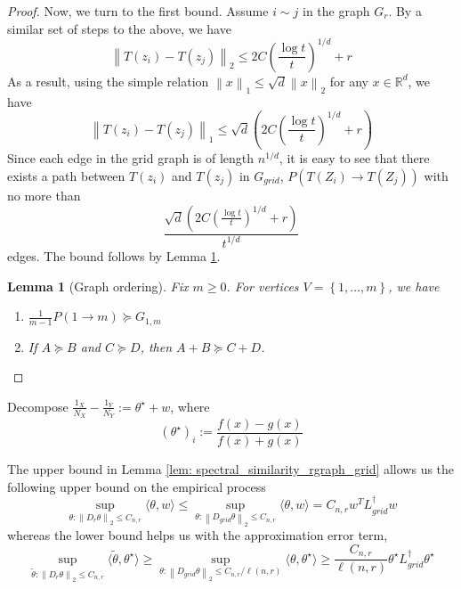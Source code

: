 \documentclass{article}
\newcommand{\Reals}{\mathbb{R}}
\newcommand{\norm}[1]{\left\lVert#1\right\rVert}
\newcommand{\set}[1]{\left\{#1\right\}}
\newcommand{\dotp}[2]{\langle #1, #2 \rangle}
\newcommand{\1}{\mathbb{I}}
\newcommand{\Linv}{L^{\dagger}}
\newcommand{\Rd}{\Reals^d}
\theoremstyle{alden}
\theoremstyle{aldenthm}
\newtheorem{lemma}{Lemma}
\theoremstyle{definition}
\theoremstyle{remark}
\begin{document}
\begin{proof}
	Now, we turn to the first bound. Assume $i \sim j$ in the graph $G_r$. By a similar set of steps to the above, we have
	\begin{equation*}
	\norm{T(z_i) - T(z_j)}_2 \leq 2C\left(\frac{\log t}{t}\right)^{1/d} + r
	\end{equation*}
	As a result, using the simple relation $\norm{x}_1 \leq \sqrt{d} \norm{x}_2$ for any $x \in \Rd$, we have
	\begin{equation*}
	\norm{T(z_i) - T(z_j)}_1 \leq \sqrt{d}(2C\left(\frac{\log t}{t}\right)^{1/d} + r)
	\end{equation*}
	Since each edge in the grid graph is of length $n^{1/d}$, it is easy to see that there exists a path between $T(z_i)$ and $T(z_j)$ in $G_{grid}$, $P(T(Z_i) \to T(Z_j))$ with no more than
	\begin{equation*}
		\frac{\sqrt{d}(2C\left(\frac{\log t}{t}\right)^{1/d} + r)}{t^{1/d}}
	\end{equation*}
	edges. The bound follows by Lemma \ref{lem: graph_ordering}.
	\begin{lemma}[Graph ordering]
	\label{lem: graph_ordering}
	Fix $m \geq 0$. For vertices $V = \set{1, \ldots,m}$, we have
	\begin{enumerate}
		\item $\frac{1}{m - 1}P(1 \to m) \succeq G_{1,m}$
		\item If $A \succeq B$ and $C \succeq D$, then $A + B \succeq C + D$. 
	\end{enumerate}
	\end{lemma}
\end{proof}

Decompose $\frac{1_X}{N_X} - \frac{1_Y}{N_Y} := \theta^{\star} + w$, where
\begin{equation*}
(\theta^{\star})_i := \frac{f(x) - g(x)}{f(x) + g(x)}
\end{equation*}

The upper bound in Lemma \ref{lem: spectral_similarity_rgraph_grid} allows us the following upper bound on the empirical process
\begin{equation*}
\sup_{\theta: \norm{D_{r}\theta}_2 \leq C_{n,r}} \dotp{\theta}{w} \leq  \sup_{\theta: \norm{D_{grid}\theta}_2 \leq C_{n,r}} \dotp{\theta}{w} = C_{n,r} w^T{\Linv_{grid}}w 
\end{equation*}
whereas the lower bound helps us with the approximation error term,
\begin{equation*}
\sup_{\widetilde{\theta}: \norm{D_{r}\theta}_2 \leq C_{n,r}} \dotp{\widetilde{\theta}}{\theta^{\star}} \geq \sup_{\theta: \norm{D_{grid}\theta}_2 \leq C_{n,r}/ \ell(n,r)} \dotp{\theta}{\theta^{\star}} \geq \frac{C_{n,r}}{\ell(n,r)} \theta^{\star}\Linv_{grid} \theta^{\star}
\end{equation*}

\clearpage



\end{document}
